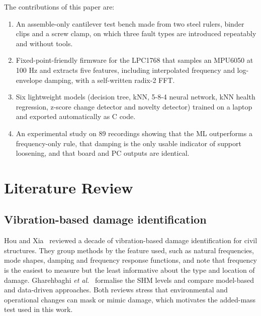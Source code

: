 \documentclass[conference]{IEEEtran}
\begin{document}
The contributions of this paper are:
\begin{enumerate}
\item An assemble-only cantilever test bench made from two steel rulers, binder clips and a screw clamp, on which three fault types are introduced repeatably and without tools.
\item Fixed-point-friendly firmware for the LPC1768 that samples an MPU6050 at 100 Hz and extracts five features, including interpolated frequency and log-envelope damping, with a self-written radix-2 FFT.
\item Six lightweight models (decision tree, kNN, 5-8-4 neural network, kNN health regression, z-score change detector and novelty detector) trained on a laptop and exported automatically as C code.
\item An experimental study on 89 recordings showing that the ML outperforms a frequency-only rule, that damping is the only usable indicator of support loosening, and that board and PC outputs are identical.
\end{enumerate}

\section{Literature Review}
\subsection{Vibration-based damage identification}
Hou and Xia~\cite{hou2021} reviewed a decade of vibration-based damage identification for civil structures. They group methods by the feature used, such as natural frequencies, mode shapes, damping and frequency response functions, and note that frequency is the easiest to measure but the least informative about the type and location of damage. Gharehbaghi \emph{et al.}~\cite{gharehbaghi2022} formalise the SHM levels and compare model-based and data-driven approaches. Both reviews stress that environmental and operational changes can mask or mimic damage, which motivates the added-mass test used in this work.
\end{document}
